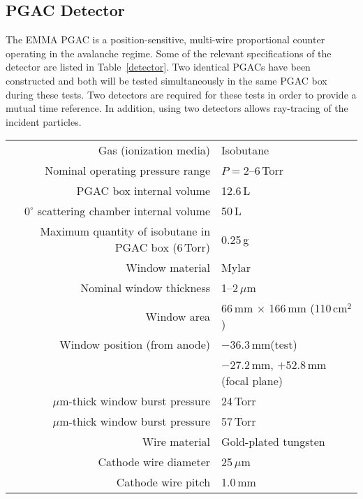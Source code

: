\subsection{PGAC Detector}
The EMMA PGAC is a position-sensitive, multi-wire proportional counter operating in the avalanche regime. Some of the relevant specifications of the detector are listed in Table~\ref{detector}.  Two identical PGACs have been constructed and both will be tested simultaneously in the same PGAC box during these tests.  Two detectors are required for these tests in order to provide a mutual time reference.  In addition, using two detectors allows ray-tracing of the incident particles.

\begin{table}[t]
\begin{center}
\begin{tabulary}{1.0\textwidth}{R|L} 
\raggedleft Gas (ionization media)&Isobutane\\
\raggedleft Nominal operating pressure range&$P=2$--6\,Torr\\
\raggedleft PGAC box internal volume & 12.6\,L\\
\raggedleft $0^\circ$ scattering chamber internal volume & 50\,L\\
\raggedleft Maximum quantity of isobutane in PGAC box (6\,Torr)&0.25\,g\\
\hline %
\raggedleft Window material &Mylar\\
\raggedleft Nominal window thickness&1--2\,$\mu$m\\
\raggedleft Window area& 66\,mm $\times$ 166\,mm (110\,cm$^2$)\\
\raggedleft Window position (from anode)& $-36.3$\,mm\hspace{5.4em}(test)\\
&$-27.2$\,mm,  $+52.8$\,mm (focal plane)\\
\,$\mu$m-thick window burst pressure &24\,Torr\\
\,$\mu$m-thick window burst pressure &57\,Torr\\
\hline %
\raggedleft Wire material&Gold-plated tungsten\\
\raggedleft Cathode wire diameter&25\,$\mu$m\\
\raggedleft Cathode wire pitch&1.0\,mm\\

\end{tabulary}
\end{center}
\end{table}
